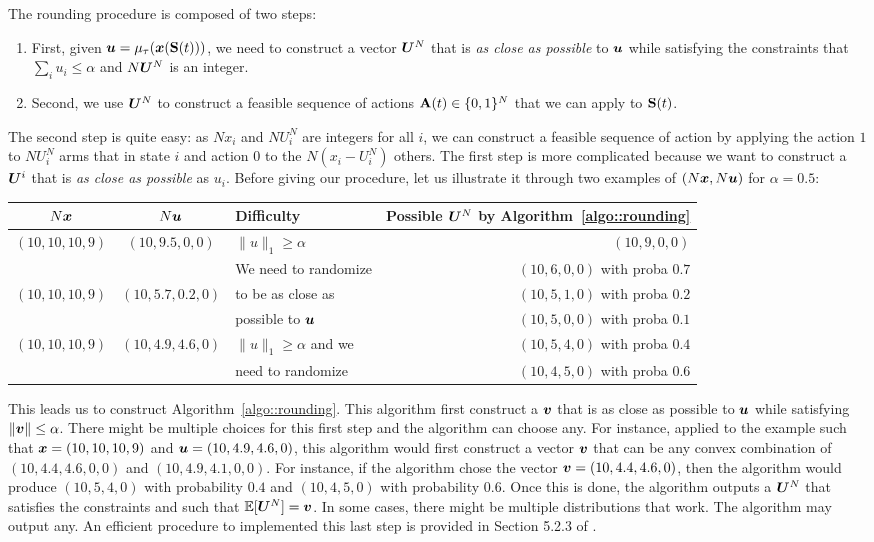 The rounding procedure is composed of two steps:
\begin{enumerate}
    \item First, given $\bm{u} = \mu_\tau({\bm{x}}(\textbf{S}(t)))$, we need to construct a vector $\bm{U}^N$ that is \emph{as close as possible} to $\bm{u}$ while satisfying the constraints that $\sum_i u_i \leq \alpha$ and $N\bm{U}^N$ is an integer. 
    \item Second, we use $\bm{U}^N$ to construct a feasible sequence of actions $\textbf{A}(t)\in\{0,1\}^N$ that we can apply to $\textbf{S}(t)$. 
\end{enumerate}
The second step is quite easy: as $Nx_i$ and $NU^N_i$ are integers for all $i$, we can construct a feasible sequence of action by applying the action $1$ to $NU^N_i$ arms that in state $i$ and action $0$ to the $N(x_i-U^N_i)$ others. The first step is more complicated because we want to construct a $\bm{U}^i$ that is \emph{as close as possible} as $u_i$. Before giving our procedure, let us illustrate it through two examples of $(N{\bm{x}},N\bm{u})$ for $\alpha=0.5$:
\begin{center}
    \begin{tabular}{|c|c||l|r|}
        \hline
         $N{\bm{x}}$ & $N\bm{u}$  & Difficulty & Possible $\bm{U}^N$ by Algorithm~\ref{algo::rounding}\\\hline
         $(10,10,10,9)$&$(10,9.5,0,0)$& $\|u\|_1 \ge \alpha$& $(10, 9, 0, 0)$ \\\hline
         && We need to randomize& $(10,6,0,0)$ with proba $0.7$\\
         $(10,10, 10, 9)$ &$(10, 5.7, 0.2, 0)$&to be as close as& $(10,5,1,0)$ with proba $0.2$\\
         &&possible to $\bm{u}$&$(10,5,0,0)$ with proba $0.1$\\\hline
         $(10,10, 10, 9)$ &$(10, 4.9, 4.6, 0)$&$\|u\|_1\ge\alpha$ and we& $(10,5,4,0)$ with proba $0.4$\\
         &&need to randomize &$(10,4,5,0)$ with proba $0.6$\\\hline
    \end{tabular}
\end{center}

This leads us to construct Algorithm~\ref{algo::rounding}. This algorithm first construct a $\bm{v}$ that is as close as possible to $\bm{u}$ while satisfying $\|\bm{v}\|\le\alpha$. There might be multiple choices for this first step and the algorithm can choose any.  For instance, applied to the example such that ${\bm{x}}=(10,10, 10, 9)$ and $\bm{u}=(10, 4.9, 4.6, 0)$, this algorithm would first construct a vector $\bm{v}$ that can be any convex combination of $(10, 4.4, 4.6, 0, 0)$ and $(10, 4.9, 4.1, 0, 0)$. For instance, if the algorithm chose the vector $\bm{v}=(10, 4.4, 4.6, 0)$, then the algorithm would produce $(10,5,4,0)$ with probability $0.4$ and $(10,4,5,0)$ with probability $0.6$.  Once this is done, the algorithm outputs a $\bm{U}^N$ that satisfies the constraints and such that $\mathbb{E}[\bm{U}^N]=\bm{v}$. In some cases, there might be multiple distributions that work. The algorithm may output any. An efficient procedure to implemented this last step is provided in Section 5.2.3 of \cite{ioannidis2016adaptive}. 

